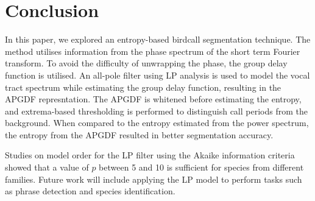 \documentclass[a4paper]{article}
\begin{document}
 
\section{Conclusion}
In this paper, we explored an entropy-based birdcall segmentation technique. The
method utilises information from the phase spectrum of the short term Fourier
transform. To avoid the difficulty of unwrapping the phase, the group delay
function is utilised. An all-pole filter using LP analysis is used to model the
vocal tract spectrum while estimating the group delay function, resulting in the
APGDF represntation. The APGDF is whitened before estimating the entropy, and
extrema-based thresholding is performed to distinguish call periods from the
background. When compared to the entropy estimated from the power spectrum, the
entropy from the APGDF resulted in better segmentation accuracy.

Studies on model order for the LP filter using the Akaike information criteria
showed that a value of $p$ between 5 and 10 is sufficient for species from
different families. Future work will include applying the LP model to perform
tasks such as phrase detection and species identification.

  \newpage
  \eightpt
  

  
\end{document}
